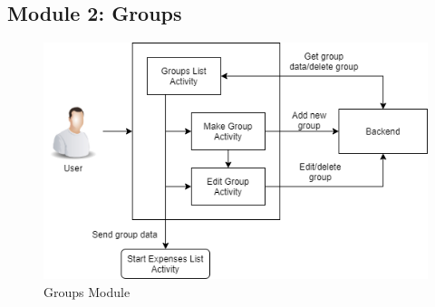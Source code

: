 \documentclass[conference]{IEEEtran}
\begin{document}
\subsection{Module 2: Groups}
    \begin{figure}[H]
        \centerline{\includegraphics[scale=0.4]{img/flowcharts/flowchart-module-groups.png}}
        \caption{Groups Module}
        \label{fig:groups-module-flowchart}
    \end{figure}
\end{document}
